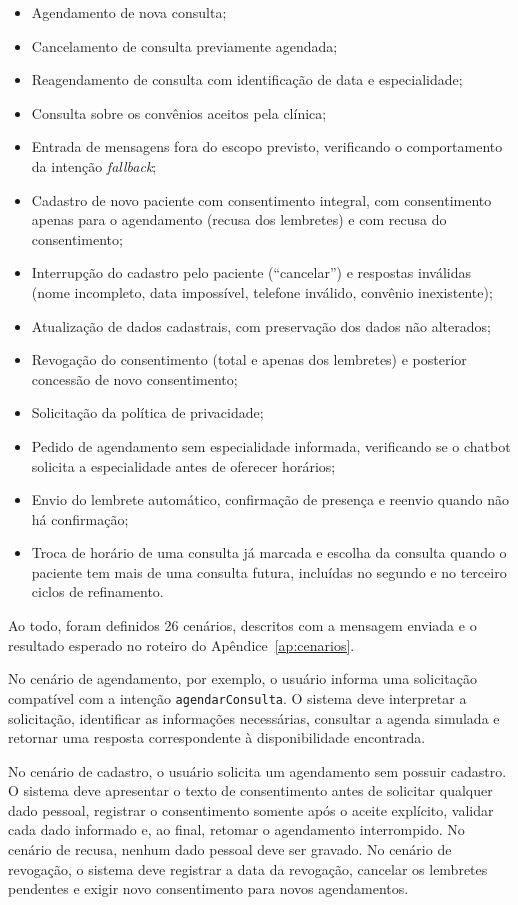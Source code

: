 \documentclass[12pt,a4paper]{extarticle}
\begin{document}
\begin{itemize}
    \item Agendamento de nova consulta;
    \item Cancelamento de consulta previamente agendada;
    \item Reagendamento de consulta com identificação de data e especialidade;
    \item Consulta sobre os convênios aceitos pela clínica;
    \item Entrada de mensagens fora do escopo previsto, verificando o comportamento da intenção \textit{fallback};
    \item Cadastro de novo paciente com consentimento integral, com consentimento apenas para o agendamento (recusa dos lembretes) e com recusa do consentimento;
    \item Interrupção do cadastro pelo paciente (``cancelar'') e respostas inválidas (nome incompleto, data impossível, telefone inválido, convênio inexistente);
    \item Atualização de dados cadastrais, com preservação dos dados não alterados;
    \item Revogação do consentimento (total e apenas dos lembretes) e posterior concessão de novo consentimento;
    \item Solicitação da política de privacidade;
    \item Pedido de agendamento sem especialidade informada, verificando se o chatbot solicita a especialidade antes de oferecer horários;
    \item Envio do lembrete automático, confirmação de presença e reenvio quando não há confirmação;
    \item Troca de horário de uma consulta já marcada e escolha da consulta quando o paciente tem mais de uma consulta futura, incluídas no segundo e no terceiro ciclos de refinamento.
\end{itemize}

Ao todo, foram definidos 26 cenários, descritos com a mensagem enviada e o resultado esperado no roteiro do Apêndice~\ref{ap:cenarios}.

No cenário de agendamento, por exemplo, o usuário informa uma solicitação compatível com a intenção \texttt{agendarConsulta}. O sistema deve interpretar a solicitação, identificar as informações necessárias, consultar a agenda simulada e retornar uma resposta correspondente à disponibilidade encontrada.

No cenário de cadastro, o usuário solicita um agendamento sem possuir cadastro. O sistema deve apresentar o texto de consentimento antes de solicitar qualquer dado pessoal, registrar o consentimento somente após o aceite explícito, validar cada dado informado e, ao final, retomar o agendamento interrompido. No cenário de recusa, nenhum dado pessoal deve ser gravado. No cenário de revogação, o sistema deve registrar a data da revogação, cancelar os lembretes pendentes e exigir novo consentimento para novos agendamentos.
\end{document}
